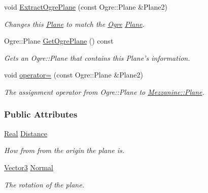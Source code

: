 \begin{DoxyCompactItemize}
void \hyperlink{classMezzanine_1_1Plane_a8a2df34f4af3ef8bc70a91a613b03ed5}{ExtractOgrePlane} (const Ogre::Plane \&Plane2)
\begin{DoxyCompactList}\small\item\em Changes this \hyperlink{classMezzanine_1_1Plane}{Plane} to match the \hyperlink{namespaceOgre}{Ogre} \hyperlink{classMezzanine_1_1Plane}{Plane}. \item\end{DoxyCompactList}\item 
Ogre::Plane \hyperlink{classMezzanine_1_1Plane_ad1bc798271d903d1045498f0eb5691a0}{GetOgrePlane} () const 
\begin{DoxyCompactList}\small\item\em Gets an Ogre::Plane that contains this Plane's information. \item\end{DoxyCompactList}\item 
void \hyperlink{classMezzanine_1_1Plane_ae4249e24fa92eb28d6adc70b6b98e32d}{operator=} (const Ogre::Plane \&Plane2)
\begin{DoxyCompactList}\small\item\em The assignment operator from Ogre::Plane to \hyperlink{classMezzanine_1_1Plane}{Mezzanine::Plane}. \item\end{DoxyCompactList}\end{DoxyCompactItemize}
\subsubsection*{Public Attributes}
\begin{DoxyCompactItemize}
\item 
\hypertarget{classMezzanine_1_1Plane_a434b3f31159b9c4ee75bb1f855e340a9}{
\hyperlink{namespaceMezzanine_a726731b1a7df72bf3583e4a97282c6f6}{Real} \hyperlink{classMezzanine_1_1Plane_a434b3f31159b9c4ee75bb1f855e340a9}{Distance}}
\label{classMezzanine_1_1Plane_a434b3f31159b9c4ee75bb1f855e340a9}

\begin{DoxyCompactList}\small\item\em How from from the origin the plane is. \item\end{DoxyCompactList}\item 
\hypertarget{classMezzanine_1_1Plane_a53739e48e75ba8fc6c6bfc55f96cf201}{
\hyperlink{classMezzanine_1_1Vector3}{Vector3} \hyperlink{classMezzanine_1_1Plane_a53739e48e75ba8fc6c6bfc55f96cf201}{Normal}}
\label{classMezzanine_1_1Plane_a53739e48e75ba8fc6c6bfc55f96cf201}

\begin{DoxyCompactList}\small\item\em The rotation of the plane. \item\end{DoxyCompactList}\end{DoxyCompactItemize}


